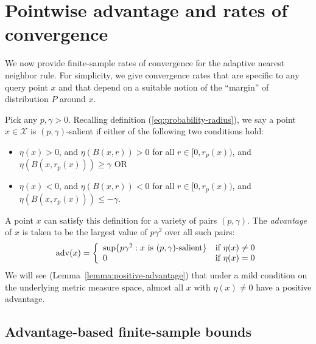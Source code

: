 \documentclass{article}
\def\X{{\mathcal X}}
\def\adv{{\rm adv}}
\begin{document}
\section{Pointwise advantage and rates of convergence}\label{sec:gen1}

We now provide finite-sample rates of convergence for the adaptive nearest neighbor rule. For simplicity, we give convergence rates that are specific to any query point $x$ and that depend on a suitable notion of the ``margin'' of distribution $P$ around $x$.

Pick any $p, \gamma > 0$. Recalling definition (\ref{eq:probability-radius}), we say a point $x \in \X$ is $(p, \gamma)$-salient if either of the following two conditions hold:
\begin{itemize}
\item $\eta(x) > 0$, and $\eta(B(x,r)) > 0$ for all $r \in [0,r_p(x))$, and $\eta(B(x,r_p(x))) \geq \gamma$ \qquad OR
\item $\eta(x) < 0$, and $\eta(B(x,r)) < 0$ for all $r \in [0,r_p(x))$, and $\eta(B(x,r_p(x))) \leq -\gamma$.
\end{itemize}
A point $x$ can satisfy this definition for a variety of pairs $(p,\gamma)$. The {\it advantage} of $x$ is taken to be the largest value of $p\gamma^2$ over all such pairs:
\begin{equation}
\adv(x) = 
\left\{
\begin{array}{ll}
\sup \{ p \gamma^2: \mbox{$x$ is $(p,\gamma)$-salient}\} & \mbox{if $\eta(x) \neq 0$} \\
0 & \mbox{if $\eta(x) = 0$}
\end{array}
\right.
\label{eq:advantage}
\end{equation}
We will see (Lemma~\ref{lemma:positive-advantage}) that under a mild condition on the underlying metric measure space, almost all $x$ with $\eta(x) \neq 0$ have a positive advantage.

\subsection{Advantage-based finite-sample bounds}
\end{document}
